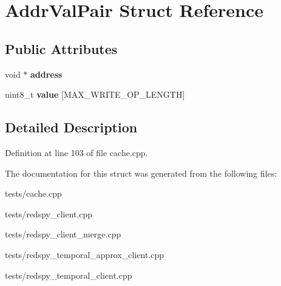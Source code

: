 \hypertarget{structAddrValPair}{\section{Addr\-Val\-Pair Struct Reference}
\label{structAddrValPair}
}
\subsection*{Public Attributes}
\begin{DoxyCompactItemize}
\item 
\hypertarget{structAddrValPair_affc25935b09d80847866e67721bd678a}{void $\ast$ {\bfseries address}}\label{structAddrValPair_affc25935b09d80847866e67721bd678a}

\item 
\hypertarget{structAddrValPair_af411fc084bb73943e2772f3cf60f1c77}{uint8\-\_\-t {\bfseries value} \mbox{[}M\-A\-X\-\_\-\-W\-R\-I\-T\-E\-\_\-\-O\-P\-\_\-\-L\-E\-N\-G\-T\-H\mbox{]}}\label{structAddrValPair_af411fc084bb73943e2772f3cf60f1c77}

\end{DoxyCompactItemize}


\subsection{Detailed Description}


Definition at line 103 of file cache.\-cpp.



The documentation for this struct was generated from the following files\-:\begin{DoxyCompactItemize}
\item 
tests/cache.\-cpp\item 
tests/redspy\-\_\-client.\-cpp\item 
tests/redspy\-\_\-client\-\_\-merge.\-cpp\item 
tests/redspy\-\_\-temporal\-\_\-approx\-\_\-client.\-cpp\item 
tests/redspy\-\_\-temporal\-\_\-client.\-cpp\end{DoxyCompactItemize}
